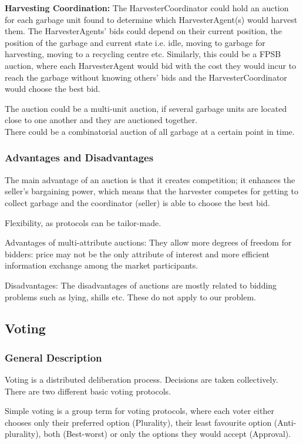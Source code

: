 \textbf{Harvesting Coordination:} The HarvesterCoordinator could hold an auction for each garbage unit found to determine which HarvesterAgent(s) would harvest them. The HarvesterAgents' bids could depend on their current position, the position of the garbage and current state i.e. idle, moving to garbage for harvesting, moving to a recycling centre etc. Similarly, this could be a FPSB auction, where each HarvesterAgent would bid with the cost they would incur to reach the garbage without knowing others' bids and the HarvesterCoordinator would choose the best bid. 

The auction could be a multi-unit auction, if several garbage units are located close to one another and they are auctioned together.
\\There could be a combinatorial auction of all garbage at a certain point in time.

\subsubsection{Advantages and Disadvantages}

The main advantage of an auction is that it creates competition; it enhances the seller's bargaining power, which means that the harvester competes for getting to collect garbage and the coordinator (seller) is able to choose the best bid.

Flexibility, as protocols can be tailor-made.

Advantages of multi-attribute auctions: They allow more degrees of freedom for bidders: price may not be the only attribute of interest and more efficient information exchange among the market participants.

Disadvantages:
The disadvantages of auctions are mostly related to bidding problems such as lying, shills etc. These do not apply to our problem. 


\subsection{Voting}

\subsubsection{General Description}

Voting is a distributed deliberation process. Decisions are taken collectively. There are two different basic voting protocols. 

Simple voting is a group term for voting protocols, where each voter either chooses only their preferred option (Plurality), their least favourite option (Anti-plurality), both (Best-worst) or only the options they would accept (Approval).

